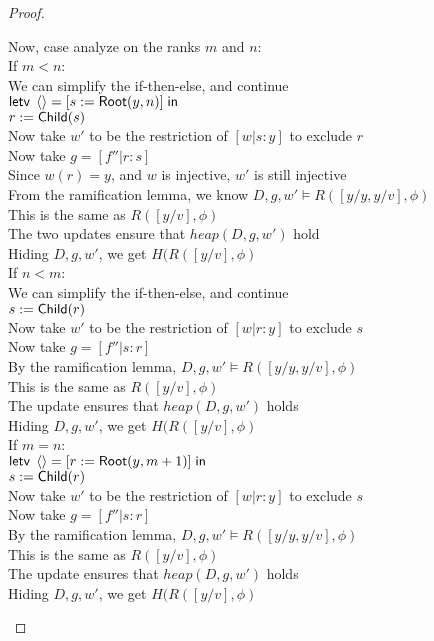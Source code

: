 \begin{proof}
\begin{tabbedproof}
\oooo Now, case analyze on the ranks $m$ and $n$: \\
\oooo If $m < n$: \\
\ooooo We can simplify the if-then-else, and continue \\
\ooooo $\mathsf{letv}\;\left<\right> = [s := \mathsf{Root}(y, n)]\;\mathsf{in}\;$ \\
\ooooo $r := \mathsf{Child}(s)$ \\
\ooooo Now take $w'$ to be the restriction of $[w|s:y]$ to exclude $r$ \\
\ooooo Now take $g = [f''|r:s]$ \\
\ooooo Since $w(r) = y$, and $w$ is injective, $w'$ is still injective \\
\ooooo From the ramification lemma, we know $D, g, w' \models R([y/y, y/v], \phi)$ \\
\ooooo This is the same as $R([y/v], \phi)$ \\
\ooooo The two updates ensure that $\mathit{heap}(D, g, w')$ hold \\
\ooooo Hiding $D, g, w'$, we get $H(R([y/v], \phi)$ \\
\oooo If $n < m$: \\
\ooooo We can simplify the if-then-else, and continue \\
\ooooo $s := \mathsf{Child}(r)$ \\
\ooooo Now take $w'$ to be the restriction of $[w|r:y]$ to exclude $s$ \\
\ooooo Now take $g = [f''|s:r]$ \\
\ooooo By the ramification lemma, $D, g, w' \models R([y/y, y/v], \phi)$ \\
\ooooo This is the same as $R([y/v], \phi)$ \\
\ooooo The update ensures that $\mathit{heap}(D, g, w')$ holds \\
\ooooo Hiding $D, g, w'$, we get $H(R([y/v], \phi)$ \\
\oooo If $m = n$: \\
\ooooo $\mathsf{letv}\;\left<\right> = [r := \mathsf{Root}(y, m+1)]\;\mathsf{in}\;$ \\
\ooooo $s := \mathsf{Child}(r)$ \\
\ooooo Now take $w'$ to be the restriction of $[w|r:y]$ to exclude $s$ \\
\ooooo Now take $g = [f''|s:r]$ \\
\ooooo By the ramification lemma, $D, g, w' \models R([y/y, y/v], \phi)$ \\
\ooooo This is the same as $R([y/v], \phi)$ \\
\ooooo The update ensures that $\mathit{heap}(D, g, w')$ holds \\
\ooooo Hiding $D, g, w'$, we get $H(R([y/v], \phi)$ \\

\end{tabbedproof}
\end{proof}

